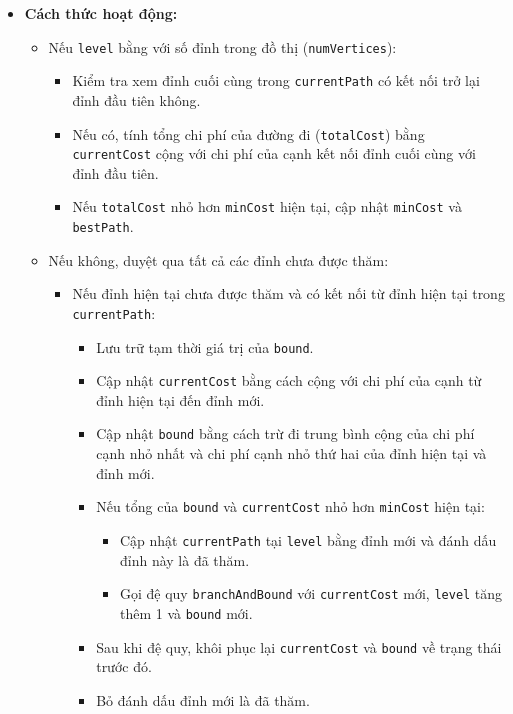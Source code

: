 \documentclass[a4paper]{article}
\begin{document}
\begin{itemize}
\begin{itemize}
    \item \textbf{Cách thức hoạt động:}
    \begin{itemize}
        \item Nếu \texttt{level} bằng với số đỉnh trong đồ thị (\texttt{numVertices}):
        \begin{itemize}
            \item Kiểm tra xem đỉnh cuối cùng trong \texttt{currentPath} có kết nối trở lại đỉnh đầu tiên không.
            \item Nếu có, tính tổng chi phí của đường đi (\texttt{totalCost}) bằng \texttt{currentCost} cộng với chi phí của cạnh kết nối đỉnh cuối cùng với đỉnh đầu tiên.
            \item Nếu \texttt{totalCost} nhỏ hơn \texttt{minCost} hiện tại, cập nhật \texttt{minCost} và \texttt{bestPath}.
        \end{itemize}
        \item Nếu không, duyệt qua tất cả các đỉnh chưa được thăm:
        \begin{itemize}
            \item Nếu đỉnh hiện tại chưa được thăm và có kết nối từ đỉnh hiện tại trong \texttt{currentPath}:
            \begin{itemize}
                \item Lưu trữ tạm thời giá trị của \texttt{bound}.
                \item Cập nhật \texttt{currentCost} bằng cách cộng với chi phí của cạnh từ đỉnh hiện tại đến đỉnh mới.
                \item Cập nhật \texttt{bound} bằng cách trừ đi trung bình cộng của chi phí cạnh nhỏ nhất và chi phí cạnh nhỏ thứ hai của đỉnh hiện tại và đỉnh mới.
                \item Nếu tổng của \texttt{bound} và \texttt{currentCost} nhỏ hơn \texttt{minCost} hiện tại:
                \begin{itemize}
                    \item Cập nhật \texttt{currentPath} tại \texttt{level} bằng đỉnh mới và đánh dấu đỉnh này là đã thăm.
                    \item Gọi đệ quy \texttt{branchAndBound} với \texttt{currentCost} mới, \texttt{level} tăng thêm 1 và \texttt{bound} mới.
                \end{itemize}
                \item Sau khi đệ quy, khôi phục lại \texttt{currentCost} và \texttt{bound} về trạng thái trước đó.
                \item Bỏ đánh dấu đỉnh mới là đã thăm.

\end{itemize}
\end{itemize}
\end{itemize}
\end{itemize}
\end{itemize}
\end{document}
